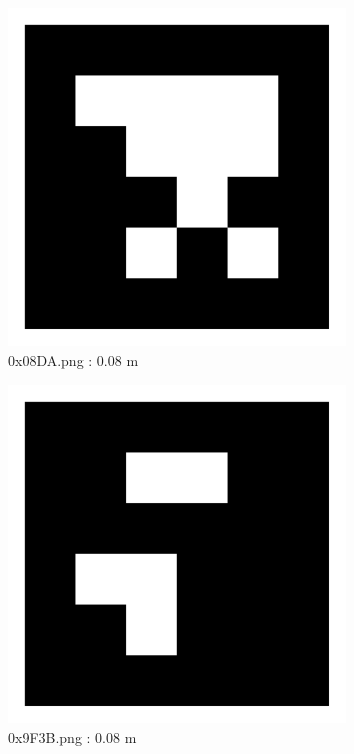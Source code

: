 \documentclass[11pt,a4,BCOR=0cm]{scrartcl}
\begin{document}
\begin{figure}
  \centering
    \includegraphics[width=8.955cm]{0x08DA.pdf}
    \caption{0x08DA.png : 0.08 m}
    \label{fig:0x08DA.pdf}
  
\end{figure} 

\clearpage

\begin{figure}
  \centering
    \includegraphics[width=8.955cm]{0x9F3B.pdf}
    \caption{0x9F3B.png : 0.08 m}
    \label{fig:0x9F3B.pdf}
  
\end{figure} 
\end{document}
